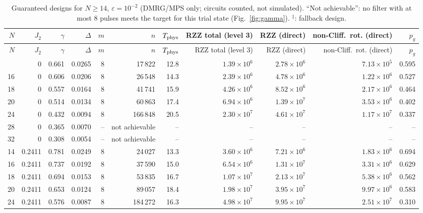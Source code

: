 \documentclass[11pt]{article}
\begin{document}
{\small
\begin{longtable}{rrrrrrrrrrr}
\caption{Guaranteed designs for $N\geq14$, $\varepsilon=10^{-2}$ (DMRG/MPS only; circuits counted, not simulated). ``Not achievable'': no filter with at most 8 pulses meets the target for this trial state (Fig.~\ref{fig:gamma}). $^\ddagger$: fallback design.}\label{tab:large}\\
\toprule
$N$ & $J_2$ & $\gamma$ & $\Delta$ & $m$ & $n$ & $T_{\rm phys}$ & RZZ total (level 3) & RZZ (direct) & non-Cliff.\ rot. (direct) & $p_g$ \\
\midrule
\endfirsthead
\toprule
$N$ & $J_2$ & $\gamma$ & $\Delta$ & $m$ & $n$ & $T_{\rm phys}$ & RZZ total (level 3) & RZZ (direct) & non-Cliff.\ rot. (direct) & $p_g$ \\
\midrule
\endhead
\bottomrule
\endfoot
14 & 0 & 0.661 & 0.0265 & 8 & 17\,822 & 12.8 & $1.39\times10^{6}$ & $2.78\times10^{6}$ & $7.13\times10^{5}$ & 0.595 \\
16 & 0 & 0.606 & 0.0206 & 8 & 26\,548 & 14.3 & $2.39\times10^{6}$ & $4.78\times10^{6}$ & $1.22\times10^{6}$ & 0.527 \\
18 & 0 & 0.557 & 0.0164 & 8 & 41\,741 & 15.9 & $4.26\times10^{6}$ & $8.52\times10^{6}$ & $2.17\times10^{6}$ & 0.464 \\
20 & 0 & 0.514 & 0.0134 & 8 & 60\,863 & 17.4 & $6.94\times10^{6}$ & $1.39\times10^{7}$ & $3.53\times10^{6}$ & 0.402 \\
24 & 0 & 0.432 & 0.0094 & 8 & 166\,848 & 20.5 & $2.30\times10^{7}$ & $4.61\times10^{7}$ & $1.17\times10^{7}$ & 0.337 \\
28 & 0 & 0.365 & 0.0070 & -- & not achievable & -- & -- & -- & -- & -- \\
32 & 0 & 0.308 & 0.0054 & -- & not achievable & -- & -- & -- & -- & -- \\
14 & 0.2411 & 0.781 & 0.0249 & 8 & 24\,027 & 13.3 & $3.60\times10^{6}$ & $7.21\times10^{6}$ & $1.83\times10^{6}$ & 0.694 \\
16 & 0.2411 & 0.737 & 0.0192 & 8 & 37\,590 & 15.0 & $6.54\times10^{6}$ & $1.31\times10^{7}$ & $3.31\times10^{6}$ & 0.629 \\
18 & 0.2411 & 0.694 & 0.0153 & 8 & 53\,835 & 16.7 & $1.07\times10^{7}$ & $2.13\times10^{7}$ & $5.38\times10^{6}$ & 0.562 \\
20 & 0.2411 & 0.653 & 0.0124 & 8 & 89\,057 & 18.4 & $1.98\times10^{7}$ & $3.95\times10^{7}$ & $9.97\times10^{6}$ & 0.583 \\
24 & 0.2411 & 0.576 & 0.0087 & 8 & 184\,272 & 16.3 & $4.98\times10^{7}$ & $9.95\times10^{7}$ & $2.51\times10^{7}$ & 0.310 \\

\end{longtable}}
\end{document}
